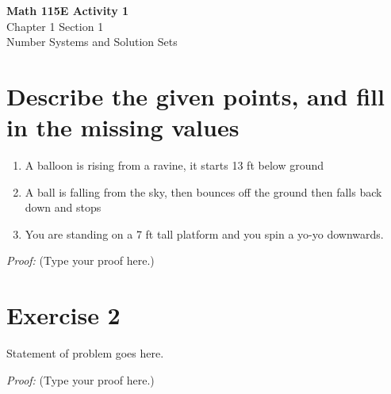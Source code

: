 \documentclass{article}
\begin{document}
\begin{center}
    \Large \textbf{Math 115E Activity 1} \\
    \vspace{0.2cm}
    \normalsize Chapter 1 Section 1 \\
    \normalsize Number Systems and Solution Sets
\end{center}
\vspace{1cm} %

\section*{Describe the given points, and fill in the missing values}
\begin{enumerate}
    \item A balloon is rising from a ravine, it starts 13 ft below ground

    \item A ball is falling from the sky, then bounces off the ground then falls back down and stops

    \item You are standing on a 7 ft tall platform and you spin a yo-yo downwards.

\end{enumerate}

\vspace{0.5cm}
\textit{Proof:} (Type your proof here.)

\vspace{1cm} %

\section*{Exercise 2}
Statement of problem goes here.

\vspace{0.5cm}
\textit{Proof:} (Type your proof here.)
\end{document}
